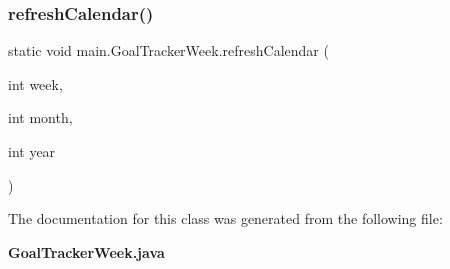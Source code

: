 \mbox{\label{classmain_1_1_goal_tracker_week_a7508790a7e52f9446de6160ad44bb938}} 
\subsubsection{refresh\+Calendar()}
{\footnotesize\ttfamily static void main.\+Goal\+Tracker\+Week.\+refresh\+Calendar (\begin{DoxyParamCaption}\item[{int}]{week,  }\item[{int}]{month,  }\item[{int}]{year }\end{DoxyParamCaption})\hspace{0.3cm}{\ttfamily [static]}}



The documentation for this class was generated from the following file\+:\begin{DoxyCompactItemize}
\item 
\textbf{ Goal\+Tracker\+Week.\+java}\end{DoxyCompactItemize}

